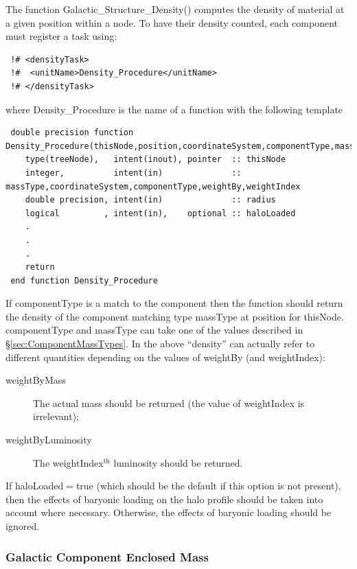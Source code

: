 The function {\normalfont \ttfamily Galactic\_Structure\_Density()} computes the density of material at a given position within a node. To have their density counted, each component must register a task using:
\begin{verbatim}
 !# <densityTask>
 !#  <unitName>Density_Procedure</unitName>
 !# </densityTask>
\end{verbatim}
where {\normalfont \ttfamily Density\_Procedure} is the name of a function with the following template
\begin{verbatim}
 double precision function Density_Procedure(thisNode,position,coordinateSystem,componentType,massType,weightBy,weightIndex,haloLoaded)
    type(treeNode),   intent(inout), pointer  :: thisNode
    integer,          intent(in)              :: massType,coordinateSystem,componentType,weightBy,weightIndex
    double precision, intent(in)              :: radius
    logical         , intent(in),    optional :: haloLoaded
    .
    .
    .
    return
 end function Density_Procedure
\end{verbatim}
If {\normalfont \ttfamily componentType} is a match to the component then the function should return the density of the component matching type {\normalfont \ttfamily massType} at {\normalfont \ttfamily position} for {\normalfont \ttfamily thisNode}. {\normalfont \ttfamily componentType} and {\normalfont \ttfamily massType} can take one of the values described in \S\ref{sec:ComponentMassTypes}. In the above ``density'' can actually refer to different quantities depending on the values of {\normalfont \ttfamily weightBy} (and {\normalfont \ttfamily weightIndex}):
\begin{description}
\item [{\normalfont \ttfamily weightByMass}] The actual mass should be returned (the value of {\normalfont \ttfamily weightIndex} is irrelevant);
\item [{\normalfont \ttfamily weightByLuminosity}] The {\normalfont \ttfamily weightIndex}$^\mathrm{th}$ luminosity should be returned.
\end{description}
If {\normalfont \ttfamily haloLoaded}$=${\normalfont \ttfamily true} (which should be the default if this option is not present), then the effects of baryonic loading on the halo profile should be taken into account where necessary. Otherwise, the effects of baryonic loading should be ignored.

\subsubsection{Galactic Component Enclosed Mass}

